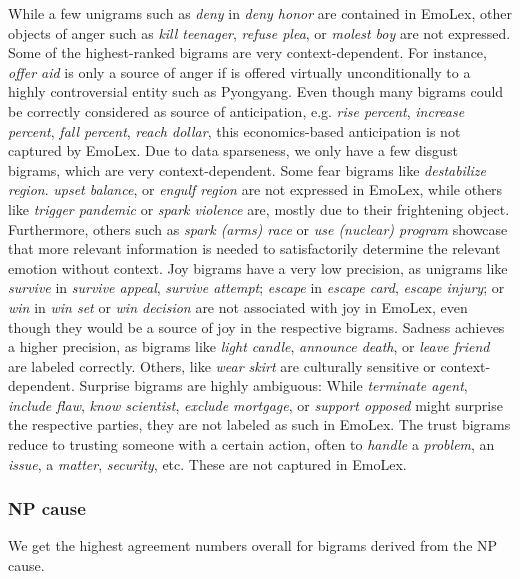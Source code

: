 While a few unigrams such as \textit{deny} in \textit{deny honor} are contained in EmoLex, other objects of anger such as \textit{kill teenager}, \textit{refuse plea}, or \textit{molest boy} are not expressed. Some of the highest-ranked bigrams are very context-dependent. For instance, \textit{offer aid} is only a source of anger if is offered virtually unconditionally to a highly controversial entity such as Pyongyang. Even though many bigrams could be correctly considered as source of anticipation, e.g. \textit{rise percent}, \textit{increase percent}, \textit{fall percent}, \textit{reach dollar}, this economics-based anticipation is not captured by EmoLex. Due to data sparseness, we only have a few disgust bigrams, which are very context-dependent.
Some fear bigrams like \textit{destabilize region}. \textit{upset balance}, or \textit{engulf region} are not expressed in EmoLex, while others like \textit{trigger pandemic} or \textit{spark violence} are, mostly due to their frightening object. Furthermore, others such as \textit{spark (arms) race} or \textit{use (nuclear) program} showcase that more relevant information is needed to satisfactorily determine the relevant emotion without context. Joy bigrams have a very low precision, as unigrams like \textit{survive} in \textit{survive appeal}, \textit{survive attempt}; \textit{escape} in \textit{escape card}, \textit{escape injury}; or \textit{win} in \textit{win set} or \textit{win decision} are not associated with joy in EmoLex, even though they would be a source of joy in the respective bigrams.
Sadness achieves a higher precision, as bigrams like \textit{light candle}, \textit{announce death}, or \textit{leave friend} are labeled correctly. Others, like \textit{wear skirt} are culturally sensitive or context-dependent.
Surprise bigrams are highly ambiguous: While \textit{terminate agent}, \textit{include flaw}, \textit{know scientist}, \textit{exclude mortgage}, or \textit{support opposed} might surprise the respective parties, they are not labeled as such in EmoLex.
The trust bigrams reduce to trusting someone with a certain action, often to \textit{handle} a \textit{problem}, an \textit{issue}, a \textit{matter}, \textit{security}, etc. These are not captured in EmoLex.

\subsubsection{NP cause}

We get the highest agreement numbers overall for bigrams derived from the NP cause.

